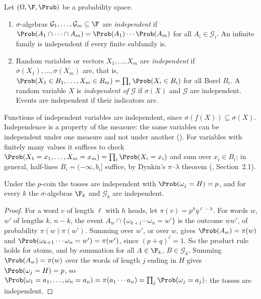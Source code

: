 \begin{definition}[Independence]\label{def:pr-independence}
Let $(\Omega,\F,\Prob)$ be a probability space.
\begin{enumerate}[label=(\roman*)]
  \item $\sigma$-algebras $\mathcal G_1,\dots,\mathcal G_m\subseteq\F$ are
    \emph{independent} if $\Prob(A_1\cap\cdots\cap A_m)=\Prob(A_1)\cdots\Prob(A_m)$ for all
    $A_i\in\mathcal G_i$. An infinite family is independent if every finite subfamily is.
  \item Random variables or vectors $X_1,\dots,X_m$ are \emph{independent} if
    $\sigma(X_1),\dots,\sigma(X_m)$ are, that is,
    $\Prob(X_1\in B_1,\dots,X_m\in B_m)=\prod_i\Prob(X_i\in B_i)$ for all Borel $B_i$. A random
    variable $X$ is \emph{independent of} $\mathcal G$ if $\sigma(X)$ and $\mathcal G$ are
    independent. Events are independent if their indicators are.
\end{enumerate}
\end{definition}

Functions of independent variables are independent, since $\sigma(f(X))\subseteq\sigma(X)$.
Independence is a property of the measure: the same variables can be independent under one
measure and not under another (). For variables with finitely many
values it suffices to check $\Prob(X_1=x_1,\dots,X_m=x_m)=\prod_i\Prob(X_i=x_i)$ and sum
over $x_i\in B_i$; in general, half-lines $B_i=(-\infty,b_i]$ suffice, by Dynkin's
$\pi$--$\lambda$ theorem (\textcite{durrett}, Section~2.1).

\begin{lemma}\label{lem:pr-tosses}
Under the $p$-coin the tosses are independent with $\Prob(\omega_j=H)=p$, and for every
$k$ the $\sigma$-algebras $\F_k$ and $\mathcal G_k$ are independent.
\end{lemma}

\begin{proof}
For a word $v$ of length $\ell$ with $h$ heads, let $\pi(v)=p^hq^{\ell-h}$. For words $w$,
$w'$ of lengths $k$, $n-k$, the event $A_w\cap\{\omega_{k+1}\cdots\omega_n=w'\}$ is the
outcome $ww'$, of probability $\pi(w)\pi(w')$. Summing over $w'$, or over $w$, gives
$\Prob(A_w)=\pi(w)$ and $\Prob(\omega_{k+1}\cdots\omega_n=w')=\pi(w')$, since
$(p+q)^\ell=1$. So the product rule holds for atoms, and by summation for all $A\in\F_k$,
$B\in\mathcal G_k$. Summing $\Prob(A_w)=\pi(w)$ over the words of length $j$ ending in $H$
gives $\Prob(\omega_j=H)=p$, so $\Prob(\omega_1=a_1,\dots,\omega_n=a_n)=\pi(a_1\cdots a_n)
=\prod_j\Prob(\omega_j=a_j)$: the tosses are independent.
\end{proof}

